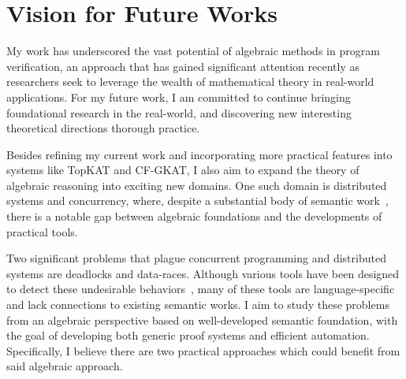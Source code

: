 \documentclass[11pt,a4paper,sans]{moderncv} %
\begin{document}

\newpage
\section{Vision for Future Works}

My work has underscored the vast potential of algebraic methods in program verification, an approach that has gained significant attention recently as researchers seek to leverage the wealth of mathematical theory in real-world applications.
For my future work, I am committed to continue bringing foundational research in the real-world, and discovering new interesting theoretical directions thorough practice.

Besides refining my current work and incorporating more practical features into systems like TopKAT and CF-GKAT, I also aim to expand the theory of algebraic reasoning into exciting new domains. 
One such domain is distributed systems and concurrency, where, despite a substantial body of semantic work~\cite{hoare_ConcurrentKleeneAlgebra_2011,kappe_ConcurrentKleeneAlgebra_2020,kappe_ConcurrentKleeneAlgebra_2018,wagemaker_PartiallyObservableConcurrent_2020,mciver_ProbabilisticConcurrentKleene_2013}, there is a notable gap between algebraic foundations and the developments of practical tools.

Two significant problems that plague concurrent programming and distributed systems are deadlocks and data-races.
Although various tools have been designed to detect these undesirable behaviors~\cite{williams_StaticDeadlockDetection_2005,masticola_StaticDetectionDeadlocks_1993,engler_RacerXEffectiveStatic_2003,naik_EffectiveStaticDeadlock_2009}, many of these tools are language-specific and lack connections to existing semantic works. 
I aim to study these problems from an algebraic perspective based on well-developed semantic foundation, with the goal of developing both generic proof systems and efficient automation. 
Specifically, I believe there are two practical approaches which could benefit from said algebraic approach.

\end{document}
